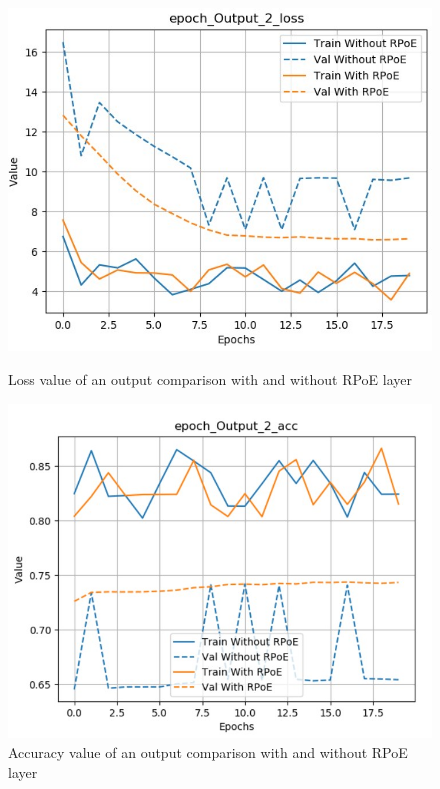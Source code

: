 \documentclass[12pt]{report}
\begin{document}
\begin{figure}[htbp]
    \begin{minipage}{0.5\textwidth}
        \begin{center}
            \includegraphics[width=\textwidth]{images/experiences/rpoe-rnn/loss-output-comparison-rpoe.jpg}
            \caption{Loss value of an output comparison with and without RPoE layer}
            \label{fig:loss-output-comparison-rpoe}
        \end{center}
    \end{minipage} \hfill
    \begin{minipage}{0.5 \textwidth}
        \begin{center}
            \includegraphics[width=\textwidth]{images/experiences/rpoe-rnn/acc-output-comparison-rpoe.jpg}
            \caption{Accuracy value of an output comparison with and without RPoE layer}
            \label{fig:acc-output-comparison-rpoe}
        \end{center}
    \end{minipage}
\end{figure}
\end{document}

